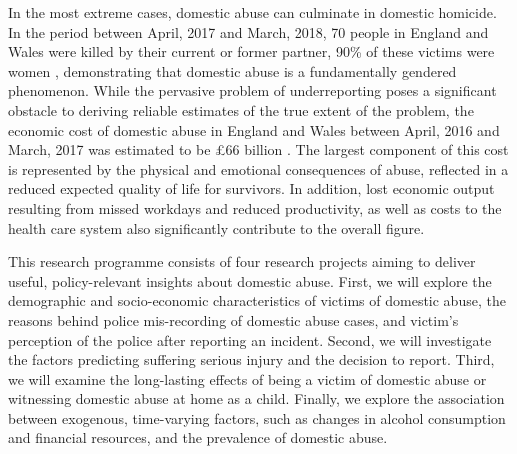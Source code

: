 \documentclass[11pt, a4paper]{article}
\begin{document}
In the most extreme cases, domestic abuse can culminate in domestic homicide. In the period between April, 2017 and March, 2018, 70 people in England and Wales were killed by their current or former partner, 90\% of these victims were women \cite{homic}, demonstrating that domestic abuse is a fundamentally gendered phenomenon. While the pervasive problem of underreporting poses a significant obstacle to deriving reliable estimates of the true extent of the problem, the economic cost of domestic abuse in England and Wales between April, 2016 and March, 2017 was estimated to be \pounds 66 billion \cite{costs}. The largest component of this cost is represented by the physical and emotional consequences of abuse, reflected in a reduced expected quality of life for survivors. In addition, lost economic output resulting from missed workdays and reduced productivity, as well as costs to the health care system also significantly contribute to the overall figure. 

This research programme consists of four research projects aiming to deliver useful, policy-relevant insights about domestic abuse. First, we will explore the demographic and socio-economic characteristics of victims of domestic abuse, the reasons behind police mis-recording of domestic abuse cases, and victim's perception of the police after reporting an incident. Second, we will investigate the factors predicting suffering serious injury and the decision to report. Third, we will examine the long-lasting effects of being a victim of domestic abuse or witnessing domestic abuse at home as a child. Finally, we explore the association between exogenous, time-varying factors, such as changes in alcohol consumption and financial resources, and the prevalence of domestic abuse. 


\end{document}
